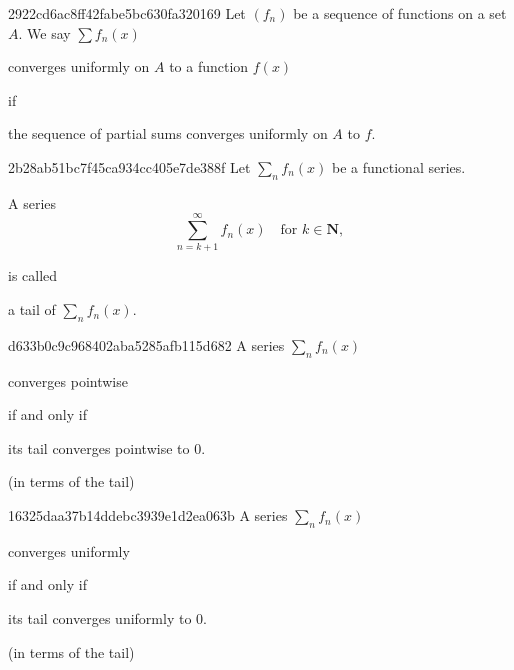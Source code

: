 \begin{note}{2922cd6ac8ff42fabe5bc630fa320169}
    Let \({ (f_n) }\) be a sequence of functions on a set \({ A }\).
    We say \({ \sum f_n(x) }\) \begin{icloze}{2}converges uniformly on \({ A }\) to a function \({ f(x) }\)\end{icloze} if \begin{icloze}{1}the sequence of partial sums converges uniformly on \({ A }\) to \({ f }\).\end{icloze}
\end{note}

\begin{note}{2b28ab51bc7f45ca934cc405e7de388f}
    Let \({ \sum_n f_n(x) }\) be a functional series.
    \begin{icloze}{1}
        A series
        \[
            \sum_{n=k+1}^{\infty} f_n(x) \quad \text{for } k \in \mathbf{N},
        \]
    \end{icloze}
    is called \begin{icloze}{2}a tail of \({ \sum_n f_n(x) }\).\end{icloze}
\end{note}

\begin{note}{d633b0c9c968402aba5285afb115d682}
    A series \({ \sum_n f_n(x) }\) \begin{icloze}{2}converges pointwise\end{icloze} \begin{icloze}{3}if and only if\end{icloze} \begin{icloze}{1}its tail converges pointwise to \({ 0 }\).\end{icloze}

    \begin{center}
        \tiny
        (in terms of the tail)
    \end{center}
\end{note}

\begin{note}{16325daa37b14ddebc3939e1d2ea063b}
    A series \({ \sum_n f_n(x) }\) \begin{icloze}{2}converges uniformly\end{icloze} \begin{icloze}{3}if and only if\end{icloze} \begin{icloze}{1}its tail converges uniformly to \({ 0 }\).\end{icloze}

    \begin{center}
        \tiny
        (in terms of the tail)
    \end{center}
\end{note}


